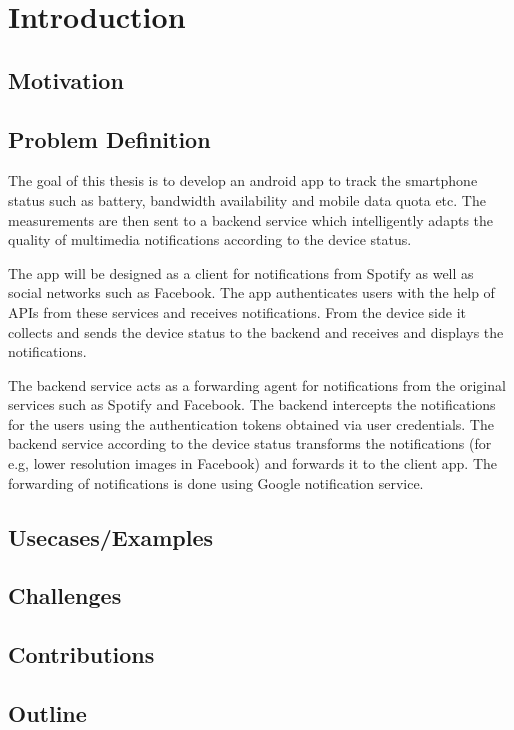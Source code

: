 
\chapter{Introduction} %
\label{Chapter1}


\section{Motivation}

\section{Problem Definition}
The goal of this thesis is to develop an android app to track the smartphone status such as battery, bandwidth availability and mobile data quota etc. The measurements are then sent to a backend service which intelligently adapts the quality of multimedia notifications according to the device status.

The app will be designed as a client for notifications from Spotify as well as social networks such as Facebook. The app authenticates users with the help of APIs from these services and receives notifications. From the device side it collects and sends the device status to the backend and receives and displays the notifications.

The backend service acts as a forwarding agent for notifications from the original services such as Spotify and Facebook. The backend intercepts the notifications for the users using the authentication tokens obtained via user credentials. The backend service according to the device status transforms the notifications (for e.g, lower resolution images in Facebook) and forwards it to the client app. The forwarding of notifications is done using Google notification service.

\section{Usecases/Examples}

\section{Challenges}

\section{Contributions}

\section{Outline}

